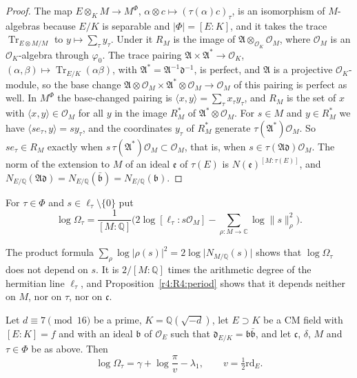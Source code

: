 \begin{proof}
The map $E\otimes_KM\to M^\Phi$, $\alpha\otimes c\mapsto(\tau(\alpha)c)_\tau$, is an isomorphism of $M$-algebras because $E/K$ is separable and $\lvert\Phi\rvert=[E:K]$, and it takes the trace $\operatorname{Tr}_{E\otimes M/M}$ to $y\mapsto\sum_\tau y_\tau$. Under it $R_M$ is the image of $\mathfrak A\otimes_{\mathcal O_K}\mathcal O_M$, where $\mathcal O_M$ is an $\mathcal O_K$-algebra through $\varphi_0$. The trace pairing $\mathfrak A\times\mathfrak A^*\to\mathcal O_K$, $(\alpha,\beta)\mapsto\operatorname{Tr}_{E/K}(\alpha\beta)$, with $\mathfrak A^*=\mathfrak A^{-1}\mathfrak d^{-1}$, is perfect, and $\mathfrak A$ is a projective $\mathcal O_K$-module, so the base change $\mathfrak A\otimes\mathcal O_M\times\mathfrak A^*\otimes\mathcal O_M\to\mathcal O_M$ of this pairing is perfect as well. In $M^\Phi$ the base-changed pairing is $\langle x,y\rangle=\sum_\tau x_\tau y_\tau$, and $R_M$ is the set of $x$ with $\langle x,y\rangle\in\mathcal O_M$ for all $y$ in the image $R_M^*$ of $\mathfrak A^*\otimes\mathcal O_M$. For $s\in M$ and $y\in R_M^*$ we have $\langle se_\tau,y\rangle=sy_\tau$, and the coordinates $y_\tau$ of $R_M^*$ generate $\tau(\mathfrak A^*)\mathcal O_M$. So $se_\tau\in R_M$ exactly when $s\,\tau(\mathfrak A^*)\mathcal O_M\subset\mathcal O_M$, that is, when $s\in\tau(\mathfrak A\mathfrak d)\mathcal O_M$. The norm of the extension to $M$ of an ideal $\mathfrak e$ of $\tau(E)$ is $N(\mathfrak e)^{[M:\tau(E)]}$, and $N_{E/\mathbb Q}(\mathfrak A\mathfrak d)=N_{E/\mathbb Q}(\bar{\mathfrak b})=N_{E/\mathbb Q}(\mathfrak b)$.
\end{proof}

\begin{definition}\label{r4:R4:Omega}
For $\tau\in\Phi$ and $s\in\ell_\tau\setminus\{0\}$ put
\[
\log\Omega_{\tau}=\frac1{[M:\mathbb Q]}\Big(2\log[\ell_\tau:s\mathcal O_M]-\sum_{\rho\colon M\to\mathbb C}\log\lVert s\rVert_\rho^2\Big).
\]
\end{definition}

The product formula $\sum_\rho\log\lvert\rho(s)\rvert^2=2\log\lvert N_{M/\mathbb Q}(s)\rvert$ shows that $\log\Omega_\tau$ does not depend on $s$. It is $2/[M:\mathbb Q]$ times the arithmetic degree of the hermitian line $\ell_\tau$, and Proposition~\ref{r4:R4:period} shows that it depends neither on $M$, nor on $\tau$, nor on $\mathfrak c$.

\begin{proposition}\label{r4:R4:period}
Let $d\equiv7\pmod{16}$ be a prime, $K=\mathbb Q(\sqrt{-d})$, let $E\supset K$ be a CM field with $[E:K]=f$ and with an ideal $\mathfrak b$ of $\mathcal O_E$ such that $\mathfrak d_{E/K}=\mathfrak b\bar{\mathfrak b}$, and let $\mathfrak c$, $\delta$, $M$ and $\tau\in\Phi$ be as above. Then
\[
\log\Omega_\tau=\gamma+\log\frac\pi v-\lambda_1,\qquad v=\tfrac12\mathrm{rd}_E .
\]
\end{proposition}

